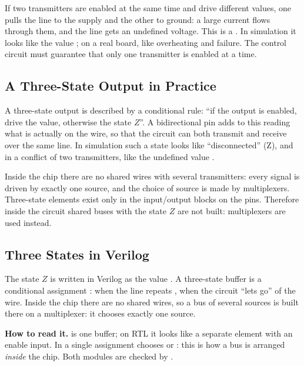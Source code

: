 \begin{warnbox}
If two transmitters are enabled at the same time and drive different values, one pulls the
line to the supply and the other to ground: a large current flows through them, and the line
gets an undefined voltage. This is a . In
simulation it looks like the value ; on a real board, like
overheating and failure. The control circuit must guarantee that
only one transmitter is enabled at a time.
\end{warnbox}

\subsection{A Three-State Output in Practice}

A three-state output is described by a conditional rule: ``if the output is enabled,
drive the value, otherwise the state $Z$''. A bidirectional pin adds to
this reading what is actually on the wire, so that the circuit can both
transmit and receive over the same line. In simulation such a
state looks like ``disconnected'' (Z), and in a conflict of two transmitters,
like the undefined value .

\begin{infobox}
Inside the chip there are no shared wires with several transmitters: every
signal is driven by exactly one source, and the choice of source is made by
multiplexers. Three-state elements exist only in the input/output blocks
on the pins. Therefore inside the circuit shared buses with the state $Z$ are not built:
multiplexers are used instead.
\end{infobox}

\subsection{Three States in Verilog}

The state $Z$ is written in Verilog as the value . A three-state buffer
is a conditional assignment : when
 the line repeats , when  the circuit
``lets go'' of the wire. Inside the chip there are no shared wires, so a bus of
several sources is built there on a multiplexer: it chooses exactly one source.


\textbf{How to read it.}  is one buffer; on RTL it looks like a
separate element with an enable input. In  a single assignment
chooses  or : this is how a bus is arranged \emph{inside} the
chip. Both modules are checked by .

